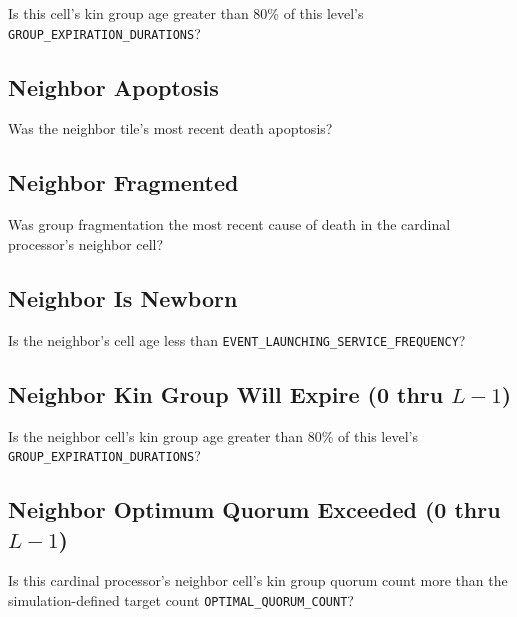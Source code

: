 
Is this cell's kin group age greater than 80\% of this level's \texttt{GROUP\_EXPIRATION\_DURATIONS}?

\subsection{Neighbor Apoptosis}

Was the neighbor tile's most recent death apoptosis?


\subsection{Neighbor Fragmented}

Was group fragmentation the most recent cause of death in the cardinal processor's neighbor cell?


\subsection{Neighbor Is Newborn}


Is the neighbor's cell age less than \texttt{EVENT\_LAUNCHING\_SERVICE\_FREQUENCY}?

\subsection{Neighbor Kin Group Will Expire (0 thru $L-1$)}


Is the neighbor cell's kin group age greater than 80\% of this level's \texttt{GROUP\_EXPIRATION\_DURATIONS}?

\subsection{Neighbor Optimum Quorum Exceeded (0 thru $L-1$)}


Is this cardinal processor's neighbor cell's kin group quorum count more than the simulation-defined target count \texttt{OPTIMAL\_QUORUM\_COUNT}?

